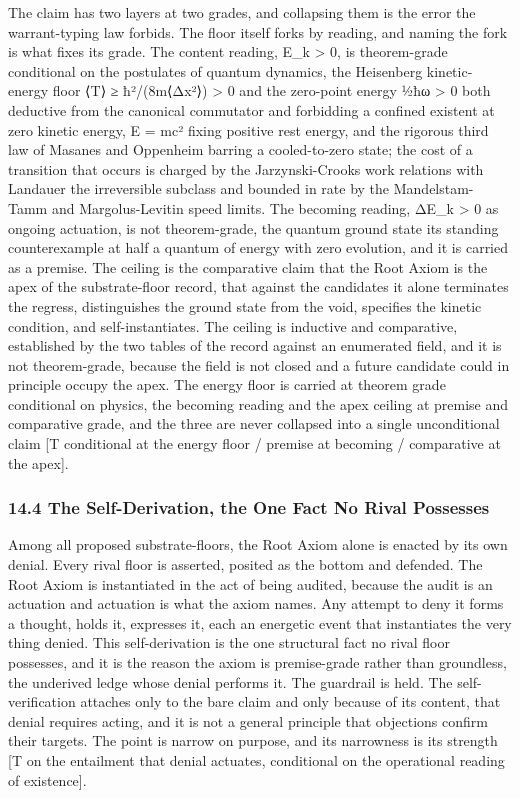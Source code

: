 \documentclass[10pt,twocolumn]{article}
\begin{document}
The claim has two layers at two grades, and collapsing them is the error
the warrant-typing law forbids. The floor itself forks by reading, and
naming the fork is what fixes its grade. The content reading, E\_k
\textgreater{} 0, is theorem-grade conditional on the postulates of
quantum dynamics, the Heisenberg kinetic-energy floor ⟨T⟩ ≥ ħ²/(8m⟨Δx²⟩)
\textgreater{} 0 and the zero-point energy ½ħω \textgreater{} 0 both
deductive from the canonical commutator and forbidding a confined
existent at zero kinetic energy, E = mc² fixing positive rest energy,
and the rigorous third law of Masanes and Oppenheim barring a
cooled-to-zero state; the cost of a transition that occurs is charged by
the Jarzynski-Crooks work relations with Landauer the irreversible
subclass and bounded in rate by the Mandelstam-Tamm and Margolus-Levitin
speed limits. The becoming reading, ΔE\_k \textgreater{} 0 as ongoing
actuation, is not theorem-grade, the quantum ground state its standing
counterexample at half a quantum of energy with zero evolution, and it
is carried as a premise. The ceiling is the comparative claim that the
Root Axiom is the apex of the substrate-floor record, that against the
candidates it alone terminates the regress, distinguishes the ground
state from the void, specifies the kinetic condition, and
self-instantiates. The ceiling is inductive and comparative, established
by the two tables of the record against an enumerated field, and it is
not theorem-grade, because the field is not closed and a future
candidate could in principle occupy the apex. The energy floor is
carried at theorem grade conditional on physics, the becoming reading
and the apex ceiling at premise and comparative grade, and the three are
never collapsed into a single unconditional claim {[}T conditional at
the energy floor / premise at becoming / comparative at the apex{]}.

\hypertarget{the-self-derivation-the-one-fact-no-rival-possesses}{%
\subsubsection{14.4 The Self-Derivation, the One Fact No Rival
Possesses}\label{the-self-derivation-the-one-fact-no-rival-possesses}}

Among all proposed substrate-floors, the Root Axiom alone is enacted by
its own denial. Every rival floor is asserted, posited as the bottom and
defended. The Root Axiom is instantiated in the act of being audited,
because the audit is an actuation and actuation is what the axiom names.
Any attempt to deny it forms a thought, holds it, expresses it, each an
energetic event that instantiates the very thing denied. This
self-derivation is the one structural fact no rival floor possesses, and
it is the reason the axiom is premise-grade rather than groundless, the
underived ledge whose denial performs it. The guardrail is held. The
self-verification attaches only to the bare claim and only because of
its content, that denial requires acting, and it is not a general
principle that objections confirm their targets. The point is narrow on
purpose, and its narrowness is its strength {[}T on the entailment that
denial actuates, conditional on the operational reading of existence{]}.
\end{document}
